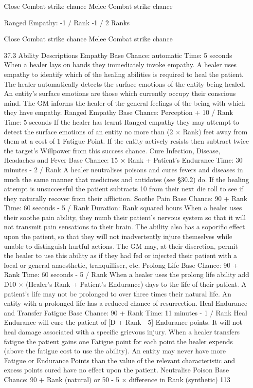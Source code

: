 \documentclass[a4paper]{article}
\begin{document}
\begin{multicols}{3}
Close Combat strike chance
Melee Combat strike chance

Ranged Empathy:
-1 / Rank
-1 / 2 Ranks

Close Combat strike chance
Melee Combat strike chance

37.3 Ability Descriptions
Empathy
Base Chance: automatic
Time: 5 seconds
When a healer lays on hands they immediately
invoke empathy.
A healer uses empathy to identify which of the
healing abilities is required to heal the patient.
The healer automatically detects the surface emotions of the entity being healed. An entity’s surface
emotions are those which currently occupy their
conscious mind. The GM informs the healer of the
general feelings of the being with which they have
empathy.
Ranged Empathy
Base Chance: Perception + 10 / Rank
Time: 5 seconds
If the healer has learnt Ranged empathy they may
attempt to detect the surface emotions of an entity
no more than (2 × Rank) feet away from them at a
cost of 1 Fatigue Point. If the entity actively resists
then subtract twice the target’s Willpower from
this success chance.
Cure Infection, Disease, Headaches and
Fever
Base Chance: 15 × Rank + Patient’s Endurance
Time: 30 minutes - 2 / Rank
A healer neutralises poisons and cures fevers and
diseases in much the same manner that medicines
and antidotes (see §30.2) do.
If the healing attempt is unsuccessful the patient
subtracts 10 from their next die roll to see if they
naturally recover from their affliction.
Soothe Pain
Base Chance: 90 + Rank
Time: 60 seconds - 5 / Rank
Duration: Rank squared hours
When a healer uses their soothe pain ability, they
numb their patient’s nervous system so that it will
not transmit pain sensations to their brain. The
ability also has a soporific effect upon the patient,
so that they will not inadvertently injure themselves while unable to distinguish hurtful actions.
The GM may, at their discretion, permit the healer
to use this ability as if they had fed or injected their
patient with a local or general anaesthetic, tranquilliser, etc.
Prolong Life
Base Chance: 90 + Rank
Time: 60 seconds - 5 / Rank
When a healer uses the prolong life ability add D10
× (Healer’s Rank + Patient’s Endurance) days to
the life of their patient. A patient’s life may not be
prolonged to over three times their natural life. An
entity with a prolonged life has a reduced chance
of resurrection.
Heal Endurance and Transfer Fatigue
Base Chance: 90 + Rank
Time: 11 minutes - 1 / Rank
Heal Endurance will cure the patient of [D + Rank
- 5] Endurance points. It will not heal damage
associated with a specific grievous injury.
When a healer transfers fatigue the patient gains
one Fatigue point for each point the healer expends
(above the fatigue cost to use the ability).
An entity may never have more Fatigue or Endurance Points than the value of the relevant characteristic and excess points cured have no effect upon
the patient.
Neutralise Poison
Base Chance: 90 + Rank (natural) or 50 - 5 ×
difference in Rank (synthetic)
113


\end{multicols}
\end{document}
